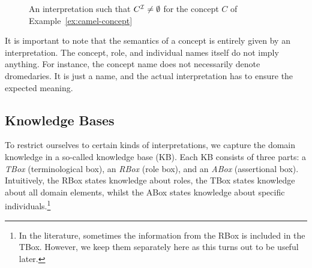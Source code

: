 \begin{figure}[t]
    \centering
    \caption{An interpretation \Imc such that $C^\mathcal{I}\ne\emptyset$ for the
        concept $C$ of Example~\ref{ex:camel-concept}}
    \label{fig:camel-concept}
\end{figure}

\noindent
It is important to note that the semantics of a concept is entirely given by an
interpretation.  The concept, role, and individual names itself do not imply
anything.  For instance, the concept name \Dromedary does not necessarily denote
dromedaries.  It is just a name, and the actual interpretation has to ensure the
expected meaning.


\subsection{Knowledge Bases}

To restrict ourselves to certain kinds of interpretations, we capture the domain
knowledge in a so-called knowledge base (KB).  Each KB consists of three parts:
a \emph{TBox} (terminological box), an \emph{RBox} (role box), and an
\emph{ABox} (assertional box).  Intuitively, the RBox states knowledge about
roles, the TBox states knowledge about all domain elements, whilst the ABox
states knowledge about specific individuals.\footnote{%
    In the literature, sometimes the information from the RBox is included in
    the TBox.  However, we keep them separately here as this turns out to be
    useful later.}

